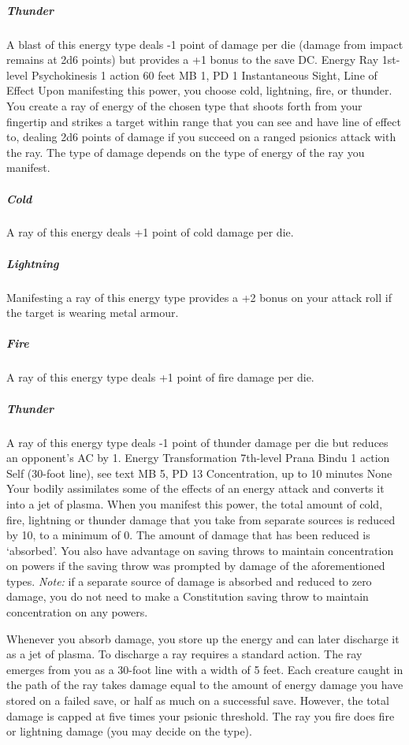 \subparagraph{Thunder}
A blast of this energy
type deals -1 point of damage per die
(damage from impact
remains at 2d6 points)
but provides a +1 bonus to the save DC.
\DndPowerHeader%
    {Energy Ray\label{pwr:energy_ray}}
    {1st-level Psychokinesis}
    {1 action}
    {60 feet}
    {MB 1, PD 1}
    {Instantaneous}
    {Sight, Line of Effect}
Upon manifesting this power,
you choose cold, lightning, fire, or thunder.
You create a ray of energy of the chosen type that
shoots forth from your fingertip and strikes a target within range
that you can see and have line of effect to,
dealing 2d6 points of damage if you succeed on a
ranged psionics attack with the ray.
The type of damage depends on
the type of energy of the ray you manifest. 
\subparagraph{Cold}
  A ray of this energy deals +1 point of cold damage per die.
\subparagraph{Lightning}
  Manifesting a ray of this energy type provides a
  +2 bonus on your attack roll if the target is wearing metal armour.
\subparagraph{Fire}
  A ray of this energy type deals +1 point of fire damage per die.
\subparagraph{Thunder}
  A ray of this energy type deals -1 point of thunder damage per die
  but reduces an opponent's AC by 1.
\DndPowerHeader%
    {Energy Transformation\label{pwr:energy_transformation}}
    {7th-level Prana Bindu}
    {1 action}
    {Self (30-foot line), see text}
    {MB 5, PD 13}
    {Concentration, up to 10 minutes}
    {None}
Your bodily assimilates some of the effects
of an energy attack and converts it into a jet of plasma.
When you manifest this power, the total amount of cold, fire,
lightning or thunder damage that you take from separate sources
is reduced by 10, to a minimum of 0. The amount of damage
that has been reduced is `absorbed'. You also have advantage
on saving throws to maintain concentration on powers if the
saving throw was prompted by damage of the aforementioned
types. \emph{Note:} if a separate source of damage is absorbed
and reduced to zero damage,
you do not need to make a Constitution saving throw
to maintain concentration on any powers.

Whenever you absorb damage, you store up the energy and can
later discharge it as a jet of plasma. To discharge a ray
requires a standard action. The ray emerges from you as a
30-foot line with a width of 5 feet. Each creature caught
in the path of the ray takes damage equal to the amount of
energy damage you have stored on a failed save, or half as
much on a successful save. However, the total damage is capped
at five times your psionic threshold. The ray you fire
does fire or lightning damage (you may decide on the type).

